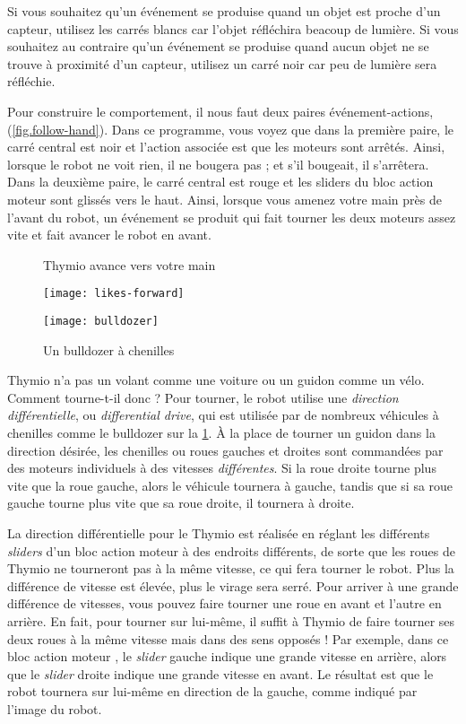Si vous souhaitez qu'un événement se produise quand un objet est proche d'un capteur, utilisez les carrés blancs car l'objet 
réfléchira beacoup de lumière.
Si vous souhaitez au contraire qu'un événement se produise
quand aucun objet ne se trouve à proximité d'un capteur,
utilisez un carré noir car peu de lumière sera réfléchie.

Pour construire le comportement, il nous faut deux paires événement-actions, (\cref{fig.follow-hand}).
Dans ce programme, vous voyez que dans la première paire, le carré central est noir et l'action associée est que les moteurs sont arrêtés.
Ainsi, lorsque le robot ne voit rien, il ne bougera pas ; et s'il bougeait, il s'arrêtera.
Dans la deuxième paire, le carré central est rouge et les sliders du bloc action moteur sont glissés vers le haut.
Ainsi, lorsque vous amenez votre main près de l'avant du robot, un événement se produit qui fait tourner les deux moteurs assez vite et fait avancer le robot en avant.


\begin{figure}
\begin{floatrow}
	\ffigbox
	{\caption{Thymio avance vers votre main}\label{fig.follow-hand}}
	{\texttt{[image: likes-forward]}}
	\ffigbox
	{\caption{Un bulldozer à chenilles}\label{fig.bull}}
	{\texttt{[image: bulldozer]}}
\end{floatrow}
\end{figure}


Thymio n'a pas un volant comme une voiture ou un guidon comme un vélo.
Comment tourne-t-il donc ? 
Pour tourner, le robot utilise une \emph{direction différentielle}, ou \emph{differential drive}, qui est  utilisée par de nombreux véhicules à chenilles comme le bulldozer sur la \cref{fig.bull}.
À la place de tourner un guidon dans la direction désirée, les chenilles ou roues gauches et droites sont commandées par des moteurs individuels à des vitesses \emph{différentes}.
Si la roue droite tourne plus vite que la roue gauche, alors le véhicule tournera à gauche, tandis que si sa roue gauche tourne plus vite que sa roue droite, il tournera à droite.

La direction différentielle pour le Thymio est réalisée 
en réglant les différents \textit{sliders} d'un bloc action moteur à des endroits différents, de sorte que les roues de Thymio ne tourneront pas à la même vitesse, ce qui fera tourner le robot.
Plus la différence de vitesse est élevée, plus le virage sera serré.
Pour arriver à une grande différence de vitesses, vous pouvez faire tourner une roue en avant et l'autre en arrière.
En fait, pour tourner sur lui-même, il suffit à Thymio de faire tourner ses deux roues à la même vitesse mais dans des sens opposés !
Par exemple, dans ce bloc action moteur , le \textit{slider} gauche indique une grande vitesse en arrière, alors que le \textit{slider} droite indique une grande vitesse en avant.
Le résultat est que le robot tournera sur lui-même en direction de la gauche, comme indiqué par l'image du robot.

